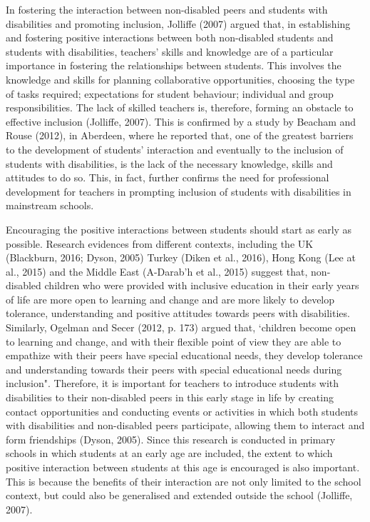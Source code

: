 \documentclass[11pt]{sig-alternate}
\begin{document}
\begin{large}
In fostering the interaction between non-disabled peers and students with disabilities and promoting inclusion, Jolliffe (2007) argued that, in establishing and fostering positive interactions between both non-disabled students and students with disabilities, teachers’ skills and knowledge are of a particular importance in fostering the relationships between students. This involves the knowledge and skills for planning collaborative opportunities, choosing the type of tasks required; expectations for student behaviour; individual and group responsibilities. The lack of skilled teachers is, therefore, forming an obstacle to effective inclusion (Jolliffe, 2007). This is confirmed by a study by Beacham and Rouse (2012), in Aberdeen, where he reported that, one of the greatest barriers to the development of students’ interaction and eventually to the inclusion of students with disabilities, is the lack of the necessary knowledge, skills and attitudes to do so. This, in fact, further confirms the need for professional development for teachers in prompting inclusion of students with disabilities in mainstream schools. 

Encouraging the positive interactions between students should start as early as possible. Research evidences from different contexts, including the UK (Blackburn, 2016; Dyson, 2005) Turkey (Diken et al., 2016), Hong Kong (Lee at al., 2015) and the Middle East (A-Darab'h et al., 2015) suggest that, non-disabled children who were provided with inclusive education in their early years of life are more open to learning and change and are more likely to develop tolerance, understanding and positive attitudes towards peers with disabilities. Similarly, Ogelman and Secer (2012, p. 173) argued that, ‘children become open to learning and change, and with their flexible point of view they are able to empathize with their peers have special educational needs, they develop tolerance and understanding towards their peers with special educational needs during inclusion". Therefore, it is important for teachers to introduce students with disabilities to their non-disabled peers in this early stage in life by creating contact opportunities and conducting events or activities in which both students with disabilities and non-disabled peers participate, allowing them to interact and form friendships (Dyson, 2005). Since this research is conducted in primary schools in which students at an early age are included, the extent to which positive interaction between students at this age is encouraged is also important. This is because the benefits of their interaction are not only limited to the school context, but could also be generalised and extended outside the school (Jolliffe, 2007). 



\end{large}
\end{document}
